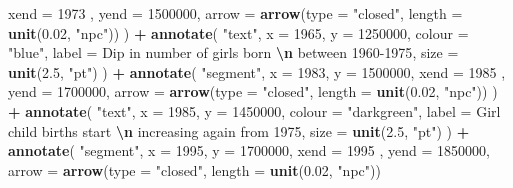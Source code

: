 \documentclass[11pt,a4paper,]{article}
\newenvironment{Shaded}{\begin{snugshade}}{\end{snugshade}}
\newcommand{\AttributeTok}[1]{\textcolor[rgb]{0.13,0.29,0.53}{#1}}
\newcommand{\DecValTok}[1]{\textcolor[rgb]{0.00,0.00,0.81}{#1}}
\newcommand{\FloatTok}[1]{\textcolor[rgb]{0.00,0.00,0.81}{#1}}
\newcommand{\FunctionTok}[1]{\textcolor[rgb]{0.13,0.29,0.53}{\textbf{#1}}}
\newcommand{\NormalTok}[1]{#1}
\newcommand{\SpecialCharTok}[1]{\textcolor[rgb]{0.81,0.36,0.00}{\textbf{#1}}}
\newcommand{\StringTok}[1]{\textcolor[rgb]{0.31,0.60,0.02}{#1}}
\begin{document}
\begin{Shaded}
\begin{Highlighting}[]
    \AttributeTok{xend =} \DecValTok{1973}\NormalTok{  ,}
    \AttributeTok{yend =} \DecValTok{1500000}\NormalTok{,}
    \AttributeTok{arrow =} \FunctionTok{arrow}\NormalTok{(}\AttributeTok{type =} \StringTok{"closed"}\NormalTok{,}
                  \AttributeTok{length =} \FunctionTok{unit}\NormalTok{(}\FloatTok{0.02}\NormalTok{, }\StringTok{"npc"}\NormalTok{))}
\NormalTok{  ) }\SpecialCharTok{+}
  \FunctionTok{annotate}\NormalTok{(}
    \StringTok{"text"}\NormalTok{,}
    \AttributeTok{x =} \DecValTok{1965}\NormalTok{,}
    \AttributeTok{y =} \DecValTok{1250000}\NormalTok{,}
    \AttributeTok{colour =} \StringTok{"blue"}\NormalTok{,}
    \AttributeTok{label =} \StringTok{\textquotesingle{}Dip in number of girls born }\SpecialCharTok{\textbackslash{}n}\StringTok{ between 1960{-}1975\textquotesingle{}}\NormalTok{,}
    \AttributeTok{size =} \FunctionTok{unit}\NormalTok{(}\FloatTok{2.5}\NormalTok{, }\StringTok{"pt"}\NormalTok{)}
\NormalTok{  ) }\SpecialCharTok{+}
  \FunctionTok{annotate}\NormalTok{(}
    \StringTok{"segment"}\NormalTok{,}
    \AttributeTok{x =} \DecValTok{1983}\NormalTok{,}
    \AttributeTok{y =} \DecValTok{1500000}\NormalTok{,}
    \AttributeTok{xend =} \DecValTok{1985}\NormalTok{  ,}
    \AttributeTok{yend =} \DecValTok{1700000}\NormalTok{,}
    \AttributeTok{arrow =} \FunctionTok{arrow}\NormalTok{(}\AttributeTok{type =} \StringTok{"closed"}\NormalTok{,}
                  \AttributeTok{length =} \FunctionTok{unit}\NormalTok{(}\FloatTok{0.02}\NormalTok{, }\StringTok{"npc"}\NormalTok{))}
\NormalTok{  ) }\SpecialCharTok{+}
  \FunctionTok{annotate}\NormalTok{(}
    \StringTok{"text"}\NormalTok{,}
    \AttributeTok{x =} \DecValTok{1985}\NormalTok{,}
    \AttributeTok{y =} \DecValTok{1450000}\NormalTok{,}
    \AttributeTok{colour =} \StringTok{"darkgreen"}\NormalTok{,}
    \AttributeTok{label =} \StringTok{\textquotesingle{}Girl child births start }\SpecialCharTok{\textbackslash{}n}\StringTok{ increasing again from 1975\textquotesingle{}}\NormalTok{,}
    \AttributeTok{size =} \FunctionTok{unit}\NormalTok{(}\FloatTok{2.5}\NormalTok{, }\StringTok{"pt"}\NormalTok{)}
\NormalTok{  ) }\SpecialCharTok{+}
    \FunctionTok{annotate}\NormalTok{(}
    \StringTok{"segment"}\NormalTok{,}
    \AttributeTok{x =} \DecValTok{1995}\NormalTok{,}
    \AttributeTok{y =} \DecValTok{1700000}\NormalTok{,}
    \AttributeTok{xend =} \DecValTok{1995}\NormalTok{  ,}
    \AttributeTok{yend =} \DecValTok{1850000}\NormalTok{,}
    \AttributeTok{arrow =} \FunctionTok{arrow}\NormalTok{(}\AttributeTok{type =} \StringTok{"closed"}\NormalTok{,}
                  \AttributeTok{length =} \FunctionTok{unit}\NormalTok{(}\FloatTok{0.02}\NormalTok{, }\StringTok{"npc"}\NormalTok{))}

\end{Highlighting}
\end{Shaded}
\end{document}
